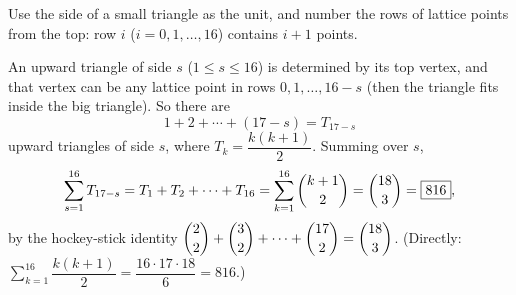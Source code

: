 Use the side of a small triangle as the unit, and number the rows of lattice points from the top: row $i$ ($i=0,1,\dots,16$) contains $i+1$ points.

An upward triangle of side $s$ ($1\le s\le16$) is determined by its top vertex, and that vertex can be any lattice point in rows $0,1,\dots,16-s$ (then the triangle fits inside the big triangle). So there are
\[1+2+\cdots+(17-s)=T_{17-s}\]
upward triangles of side $s$, where $T_k=\dfrac{k(k+1)}{2}$. Summing over $s$,
\[\sum_{s=1}^{16}T_{17-s}=T_1+T_2+\cdots+T_{16}=\sum_{k=1}^{16}\dbinom{k+1}{2}=\dbinom{18}{3}=\boxed{816},\]
by the hockey-stick identity $\dbinom22+\dbinom32+\cdots+\dbinom{17}{2}=\dbinom{18}{3}$. (Directly: $\sum_{k=1}^{16}\dfrac{k(k+1)}{2}=\dfrac{16\cdot17\cdot18}{6}=816$.)
